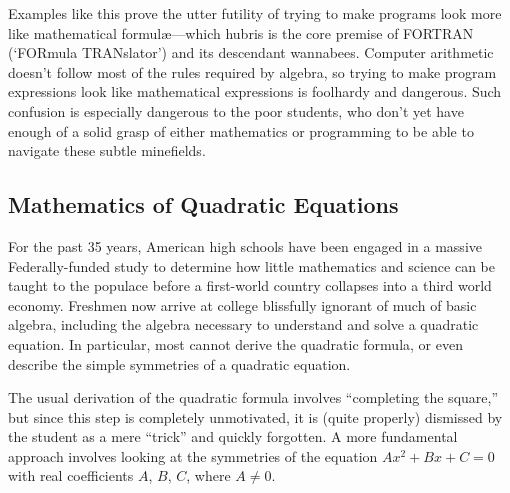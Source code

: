 \documentclass[twocolumn,epsf]{snBaker}
\begin{document}
Examples like this prove the utter futility of trying to make
programs look more like mathematical formul{\ae}---which hubris is the
core premise of FORTRAN (`FORmula TRANslator') and its descendant
wannabees.  Computer arithmetic doesn't follow most of the rules
required by algebra, so trying to make program expressions look like
mathematical expressions is foolhardy and dangerous.  Such confusion
is especially dangerous to the poor students, who don't yet have
enough of a solid grasp of either mathematics or programming to be
able to navigate these subtle minefields.

\subsection*{Mathematics of Quadratic Equations}

For the past 35 years, American high schools have been engaged in a
massive Federally-funded study to determine how little mathematics and
science can be taught to the populace before a first-world country
collapses into a third world economy.  Freshmen now arrive at college
blissfully ignorant of much of basic algebra, including the algebra
necessary to understand and solve a quadratic equation.  In
particular, most cannot derive the quadratic formula, or even describe
the simple symmetries of a quadratic equation.

The usual derivation of the quadratic formula involves ``completing
the square,'' but since this step is completely unmotivated, it is
(quite properly) dismissed by the student as a mere ``trick'' and
quickly forgotten.  A more fundamental approach involves looking at
the symmetries of the equation $Ax^2+Bx+C=0$ with real coefficients
$A$, $B$, $C$, where $A\neq 0$.
\end{document}
